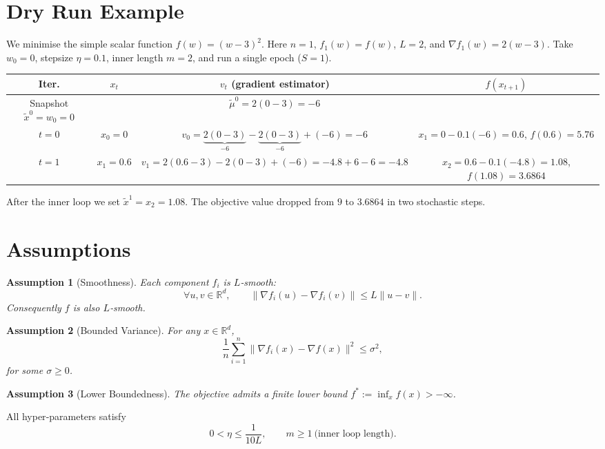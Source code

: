 \documentclass[11pt]{article}
\newtheorem{assumption}{Assumption}
\newcommand{\RR}{\mathbb{R}}
\newcommand{\grad}{\nabla}
\begin{document}
\section*{Dry Run Example}
We minimise the simple scalar function $f(w)=(w-3)^2$.
Here $n=1$, $f_1(w)=f(w)$, $L=2$, and $\grad f_1(w)=2(w-3)$.  
Take $w_0=0$, stepsize $\eta=0.1$, inner length $m=2$, and run a single epoch ($S=1$).

\begin{center}
\begin{tabular}{c|c|c|c}
\textbf{Iter.} & $x_t$ & $v_t$ (gradient estimator) & $f(x_{t+1})$\\ \hline
Snapshot $\tilde{x}^{0}=w_0=0$ & & $\tilde\mu^{0}=2(0-3)=-6$ & \\ \hline
$t=0$ & $x_0=0$ & $v_0= \underbrace{2(0-3)}_{-6}-\underbrace{2(0-3)}_{-6}+(-6) = -6$ & $x_1=0-0.1(-6)=0.6$, $f(0.6)=5.76$\\ \hline
$t=1$ & $x_1=0.6$ & $v_1=2(0.6-3)-2(0-3)+(-6)= -4.8+6-6=-4.8$ & $x_2=0.6-0.1(-4.8)=1.08$, $f(1.08)=3.6864$\\ \hline
\end{tabular}
\end{center}
After the inner loop we set $\tilde{x}^{1}=x_2=1.08$. The objective value dropped from $9$ to $3.6864$ in two stochastic steps.

\section*{Assumptions}
\begin{assumption}[Smoothness]\label{as:smooth}
Each component $f_i$ is $L$‑smooth:
\[
\forall u,v\in\RR^{d},\qquad 
\|\grad f_i(u)-\grad f_i(v)\|\le L\|u-v\|.
\]
Consequently $f$ is also $L$‑smooth.
\end{assumption}
\begin{assumption}[Bounded Variance]\label{as:variance}
For any $x\in\RR^{d}$,
\[
\frac1n\sum_{i=1}^{n}\big\|\grad f_i(x)-\grad f(x)\big\|^{2}\le\sigma^{2},
\]
for some $\sigma\ge0$.
\end{assumption}
\begin{assumption}[Lower Boundedness]\label{as:lb}
The objective admits a finite lower bound $f^{*}:=\inf_{x}f(x)>-\infty$.
\end{assumption}
All hyper‑parameters satisfy
\[
0<\eta\le\frac{1}{10L},\qquad 
m\ge 1\ \text{(inner loop length)} .
\]
\end{document}
